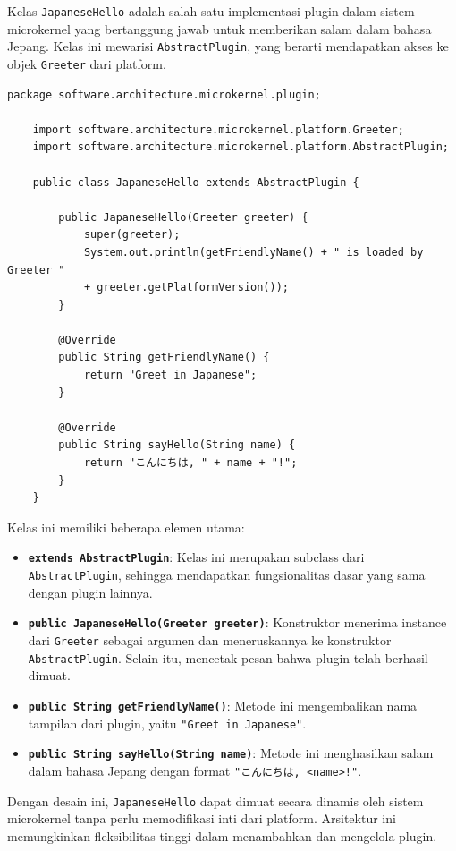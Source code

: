 Kelas \texttt{JapaneseHello} adalah salah satu implementasi plugin dalam sistem microkernel yang bertanggung jawab untuk memberikan salam dalam bahasa Jepang. Kelas ini mewarisi \texttt{AbstractPlugin}, yang berarti mendapatkan akses ke objek \texttt{Greeter} dari platform.

\begin{lstlisting}[style=JavaStyle, caption={Kelas \texttt{JapaneseHello}}, label={lst:japanese-hello}, inputencoding=utf8]
	package software.architecture.microkernel.plugin;
	
	import software.architecture.microkernel.platform.Greeter;
	import software.architecture.microkernel.platform.AbstractPlugin;
	
	public class JapaneseHello extends AbstractPlugin {
		
		public JapaneseHello(Greeter greeter) {
			super(greeter);
			System.out.println(getFriendlyName() + " is loaded by Greeter " 
			+ greeter.getPlatformVersion());
		}
		
		@Override
		public String getFriendlyName() {
			return "Greet in Japanese";
		}
		
		@Override
		public String sayHello(String name) {
			return "こんにちは, " + name + "!";
		}
	}
\end{lstlisting}




\noindent
Kelas ini memiliki beberapa elemen utama:

\begin{itemize}
	\item \textbf{\texttt{extends AbstractPlugin}}: Kelas ini merupakan subclass dari \texttt{AbstractPlugin}, sehingga mendapatkan fungsionalitas dasar yang sama dengan plugin lainnya.
	\item \textbf{\texttt{public JapaneseHello(Greeter greeter)}}: Konstruktor menerima instance dari \texttt{Greeter} sebagai argumen dan meneruskannya ke konstruktor \texttt{AbstractPlugin}. Selain itu, mencetak pesan bahwa plugin telah berhasil dimuat.
	\item \textbf{\texttt{public String getFriendlyName()}}: Metode ini mengembalikan nama tampilan dari plugin, yaitu \texttt{"Greet in Japanese"}.
	\item \textbf{\texttt{public String sayHello(String name)}}: Metode ini menghasilkan salam dalam bahasa Jepang dengan format \texttt{"こんにちは, <name>!"}.
\end{itemize}

Dengan desain ini, \texttt{JapaneseHello} dapat dimuat secara dinamis oleh sistem microkernel tanpa perlu memodifikasi inti dari platform. Arsitektur ini memungkinkan fleksibilitas tinggi dalam menambahkan dan mengelola plugin.

